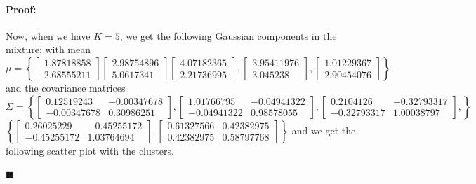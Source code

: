 \documentclass[12pt]{article}
\newenvironment{proof}{\paragraph{Proof: }}{\hfill$\blacksquare$}
\begin{document}
\begin{proof}
\begin{enumerate}
Now, when we have $K = 5$, we get the following Gaussian components in the mixture: with mean $\mu = \left\{ \left[ \begin{matrix} 1.87818858 \\ 2.68555211 \end{matrix} \right] \left[ \begin{matrix} 2.98754896 \\ 5.0617341 \end{matrix}\right] \left[ \begin{matrix} 4.07182365 \\ 2.21736995 \end{matrix}\right],\left[ \begin{matrix} 3.95411976 \\ 3.045238 \end{matrix}\right],\left[ \begin{matrix} 1.01229367 \\ 2.90454076 \end{matrix}\right] \right\}$ and the covariance matrices $\Sigma = \left\{ \left[ \begin{matrix} 0.12519243 & -0.00347678 \\ -0.00347678 & 0.30986251 \end{matrix} \right], \left[ \begin{matrix} 1.01766795 & -0.04941322 \\ -0.04941322 & 0.98578055 \end{matrix} \right], \left[ \begin{matrix} 0.2104126 & -0.32793317 \\ -0.32793317 & 1.00038797 \end{matrix} \right], \right\}$ \\ $ \left\{\left[ \begin{matrix} 0.26025229 & -0.45255172 \\ -0.45255172 & 1.03764694 \end{matrix} \right],\left[ \begin{matrix} 0.61327566 & 0.42382975 \\ 0.42382975 & 0.58797768 \end{matrix} \right] \right\}$ and we get the following scatter plot with the clusters.\\


\end{enumerate}
\end{proof}
\end{document}
